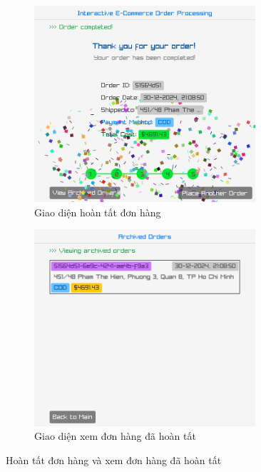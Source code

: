 \begin{figure}[!ht]
  \centering
  \begin{subfigure}{0.46\textwidth}
    \centering
    \includegraphics[width=0.9\textwidth]{../assets/screenshots/gui/order_complete.png}
    \caption{Giao diện hoàn tất đơn hàng}
  \end{subfigure}
  \hfill
  \begin{subfigure}{0.46\textwidth}
    \centering
    \includegraphics[width=0.9\textwidth]{../assets/screenshots/gui/archived_order.png}
    \caption{Giao diện xem đơn hàng đã hoàn tất}
  \end{subfigure}
  \caption{Hoàn tất đơn hàng và xem đơn hàng đã hoàn tất}
\end{figure}
